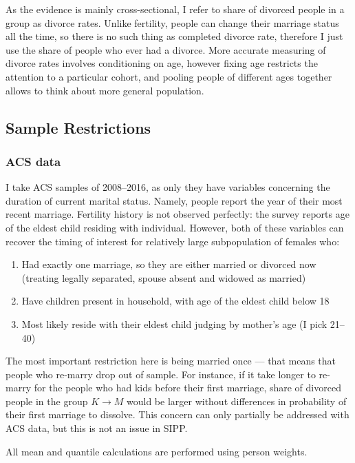 \documentclass[12pt,letter]{article}
\begin{document}
As the evidence is mainly cross-sectional, I refer to share of divorced people in a group as divorce rates. Unlike fertility, people can change their marriage status all the time, so there is no such thing as completed divorce rate, therefore I just use the share of people who ever had a divorce. More accurate measuring of divorce rates involves conditioning on age, however fixing age restricts the attention to a particular cohort, and pooling people of different ages together allows to think about more general population.


\subsection{Sample Restrictions}
\subsubsection{ACS data}
I take ACS samples of 2008--2016, as only they have variables concerning the duration of current marital status. Namely, people report the year of their most recent marriage. Fertility history is not observed perfectly: the survey reports age of the eldest child residing with individual. However, both of these variables can recover the timing of interest for relatively large subpopulation of females who:
\begin{enumerate}
\item Had exactly one marriage, so they are either married or divorced now (treating legally separated, spouse absent and widowed as married)
\item Have children present in household, with age of the eldest child below 18
\item Most likely reside with their eldest child judging by mother's age (I pick 21--40)
\end{enumerate}

The most important restriction here is being married once --- that means that people who re-marry drop out of sample. For instance, if it take longer to re-marry for the people who had kids before their first marriage, share of divorced people in the group $K\to M$ would be larger without differences in probability of their first marriage to dissolve. This concern can only partially be addressed with ACS data, but this is not an issue in SIPP. 


All mean and quantile calculations are performed using person weights.
\end{document}
